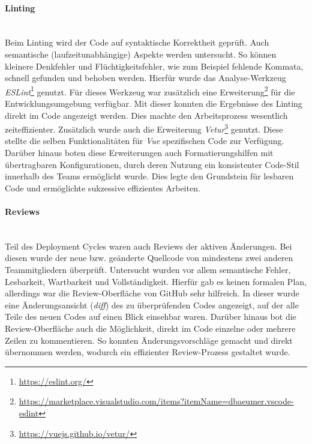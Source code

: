 \documentclass[10pt, a4paper]{article}
\begin{document}
\begin{onehalfspace}
    \paragraph*{Linting}$~$ \\
    Beim Linting wird der Code auf syntaktische Korrektheit geprüft.
    Auch semantische (laufzeitunabhängige) Aspekte werden untersucht.
    So können kleinere Denkfehler und Flüchtigkeitsfehler, wie zum Beispiel fehlende Kommata, schnell gefunden und behoben werden.
    Hierfür wurde das Analyse-Werkzeug \textit{ESLint}\footnote{\raggedright\url{https://eslint.org/}} genutzt.
    Für dieses Werkzeug war zusätzlich eine Erweiterung\footnote{\raggedright\url{https://marketplace.visualstudio.com/items?itemName=dbaeumer.vscode-eslint}} für die Entwicklungsumgebung verfügbar.
    Mit dieser konnten die Ergebnisse des Linting direkt im Code angezeigt werden.
    Dies machte den Arbeitsprozess wesentlich zeiteffizienter.
    Zusätzlich wurde auch die Erweiterung \textit{Vetur}\footnote{\raggedright\url{https://vuejs.github.io/vetur/}} genutzt.
    Diese stellte die selben Funktionalitäten für \textit{Vue} spezifischen Code zur Verfügung.
    \\
    Darüber hinaus boten diese Erweiterungen auch Formatierungshilfen mit übertragbaren Konfigurationen, durch deren Nutzung ein konsistenter Code-Stil
    innerhalb des Teams ermöglicht wurde. Dies legte den Grundstein für lesbaren Code und ermöglichte sukzessive effizientes Arbeiten.

    \paragraph*{Reviews}$~$ \\
    Teil des Deployment Cycles waren auch Reviews der aktiven Änderungen.
    Bei diesen wurde der neue bzw. geänderte Quellcode von mindestens zwei anderen Teammitgliedern überprüft.
    Untersucht wurden vor allem semantische Fehler, Lesbarkeit, Wartbarkeit und Vollständigkeit.
    Hierfür gab es keinen formalen Plan, allerdings war die Review-Oberfläche von GitHub sehr hilfreich.
    In dieser wurde eine Änderungsansicht (\textit{diff}) des zu überprüfenden Codes angezeigt, auf der alle Teile des neuen Codes auf einen Blick einsehbar waren.
    Darüber hinaus bot die Review-Oberfläche auch die Möglichkeit, direkt im Code einzelne oder mehrere Zeilen zu kommentieren.
    So konnten Änderungsvorschläge gemacht und direkt übernommen werden, wodurch ein effizienter Review-Prozess gestaltet wurde.


\end{onehalfspace}
\end{document}
